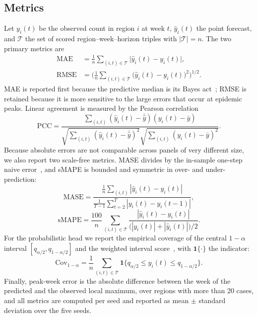 \documentclass[conference]{IEEEtran}
\begin{document}
\subsection{Metrics}\label{sec:metrics}

Let $y_i(t)$ be the observed count in region $i$ at week $t$, $\hat y_i(t)$ the point forecast, and $\mathcal{T}$ the set of scored region--week--horizon triples with $|\mathcal{T}|=n$. The two primary metrics are
\begin{equation}
\begin{aligned}
\mathrm{MAE}&=\frac1n\!\!\sum_{(i,t)\in\mathcal{T}}\!\!\big|\hat y_i(t)-y_i(t)\big|,\\[2pt]
\mathrm{RMSE}&=\Big(\frac1n\!\!\sum_{(i,t)\in\mathcal{T}}\!\!\big(\hat y_i(t)-y_i(t)\big)^2\Big)^{1/2}.
\end{aligned}
\label{eq:mae}
\end{equation}
MAE is reported first because the predictive median is its Bayes act~\cite{gneiting2011}; RMSE is retained because it is more sensitive to the large errors that occur at epidemic peaks. Linear agreement is measured by the Pearson correlation
\begin{equation}
\mathrm{PCC}=\frac{\sum_{(i,t)}(\hat y_i(t)-\bar{\hat y})(y_i(t)-\bar y)}
{\sqrt{\sum_{(i,t)}(\hat y_i(t)-\bar{\hat y})^2}\sqrt{\sum_{(i,t)}(y_i(t)-\bar y)^2}}.
\label{eq:pcc}
\end{equation}
Because absolute errors are not comparable across panels of very different size, we also report two scale-free metrics. MASE divides by the in-sample one-step naive error~\cite{hyndman2006}, and sMAPE is bounded and symmetric in over- and under-prediction:
\begin{equation}
\mathrm{MASE}=\frac{\frac1n\sum_{(i,t)}|\hat y_i(t)-y_i(t)|}
{\frac{1}{T-1}\sum_{t=2}^{T}|y_i(t)-y_i(t-1)|},
\label{eq:mase}
\end{equation}
\begin{equation}
\mathrm{sMAPE}=\frac{100}{n}\!\!\sum_{(i,t)\in\mathcal{T}}\!\!
\frac{|\hat y_i(t)-y_i(t)|}{\big(|y_i(t)|+|\hat y_i(t)|\big)/2}.
\label{eq:smape}
\end{equation}
For the probabilistic head we report the empirical coverage of the central $1-\alpha$ interval $[q_{\alpha/2},q_{1-\alpha/2}]$ and the weighted interval score~\cite{bracher2021}, with $\mathbf{1}\{\cdot\}$ the indicator:
\begin{equation}
\mathrm{Cov}_{1-\alpha}=\frac1n\!\!\sum_{(i,t)\in\mathcal{T}}\!\!
\mathbf{1}\big\{q_{\alpha/2}\leq y_i(t)\leq q_{1-\alpha/2}\big\}.
\label{eq:cov}
\end{equation}
Finally, peak-week error is the absolute difference between the week of the predicted and the observed local maximum, over regions with more than 20 cases, and all metrics are computed per seed and reported as mean $\pm$ standard deviation over the five seeds.
\end{document}

